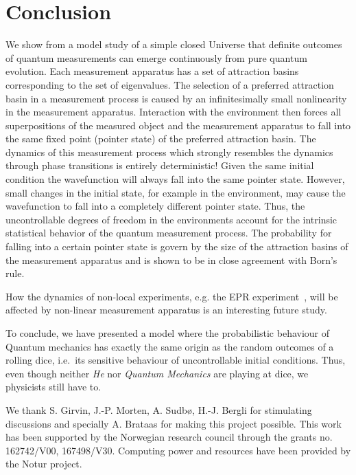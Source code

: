 \documentclass[showpacs,preprintnumbers,amsmath,amssymb,12pt]{revtex4-2}
\begin{document}
\section{Conclusion}
We show from a model study of a simple closed Universe that definite
outcomes of quantum measurements can emerge continuously from pure
quantum evolution.  Each measurement apparatus has a set of attraction
basins corresponding to the set of eigenvalues. The selection of a
preferred attraction basin in a measurement process is caused by an
infinitesimally small nonlinearity in the measurement
apparatus. Interaction with the environment then forces all
superpositions of the measured object and the measurement apparatus to
fall into the same fixed point (pointer state) of the preferred
attraction basin.  The dynamics of this measurement process which
strongly resembles the dynamics through phase transitions is entirely
deterministic!  Given the same initial condition the wavefunction will
always fall into the same pointer state. However, small changes in the
initial state, for example in the environment, may cause the
wavefunction to fall into a completely different pointer state. Thus,
the uncontrollable degrees of freedom in the environments account for
the intrinsic statistical behavior of the quantum measurement
process. The probability for falling into a certain pointer state is
govern by the size of the attraction basins of the measurement
apparatus and is shown to be in close agreement with Born's rule.

How the dynamics of non-local experiments, e.g. the EPR
experiment~\cite{epr}, will be affected by non-linear measurement
apparatus is an interesting future study.

To conclude, we have presented a model where the probabilistic
behaviour of Quantum mechanics has exactly the same origin as the
random outcomes of a rolling dice, i.e.\ its sensitive behaviour of
uncontrollable initial conditions. Thus, even though neither {\em
  He\/} nor {\em Quantum Mechanics\/} are playing at dice, we
physicists still have to.

\begin{acknowledgments}
  We thank S. Girvin, J.-P. Morten, A. Sudb{\o}, H.-J. Bergli for
  stimulating discussions and specially A. Brataas for making this
  project possible. This work has been supported by the Norwegian
  research council through the grants no. 162742/V00,
  167498/V30. Computing power and resources have been provided by the
  Notur project.
\end{acknowledgments}
\end{document}
